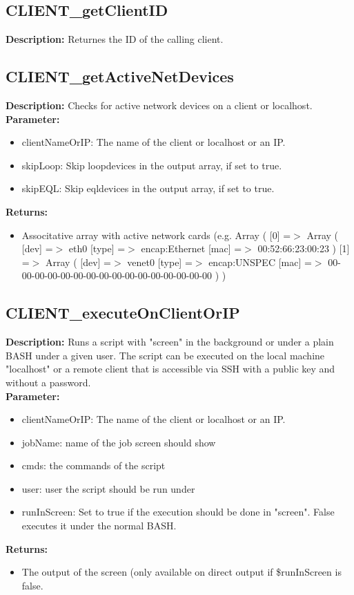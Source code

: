 \subsection{CLIENT\_getClientID}
\textbf{Description:} Returnes the ID of the calling client.\\

\subsection{CLIENT\_getActiveNetDevices}
\textbf{Description:} Checks for active network devices on a client or localhost.\\
\textbf{Parameter:}
\begin{itemize}
\item clientNameOrIP: The name of the client or localhost or an IP.
\item skipLoop: Skip loopdevices in the output array, if set to true.
\item skipEQL: Skip eqldevices in the output array, if set to true.
\end{itemize}
\textbf{Returns:}
\begin{itemize}
\item Associtative array with active network cards (e.g. Array ( [0] =$>$ Array ( [dev] =$>$ eth0 [type] =$>$ encap:Ethernet [mac] =$>$ 00:52:66:23:00:23 ) [1] =$>$ Array ( [dev] =$>$ venet0 [type] =$>$ encap:UNSPEC [mac] =$>$ 00-00-00-00-00-00-00-00-00-00-00-00-00-00-00-00 ) )
\end{itemize}

\subsection{CLIENT\_executeOnClientOrIP}
\textbf{Description:} Runs a script with "screen" in the background or under a plain BASH under a given user. The script can be executed on the local machine "localhost" or a remote client that is accessible via SSH with a public key and without a password.\\
\textbf{Parameter:}
\begin{itemize}
\item clientNameOrIP: The name of the client or localhost or an IP.
\item jobName: name of the job screen should show
\item cmds: the commands of the script 
\item user: user the script should be run under
\item runInScreen: Set to true if the execution should be done in "screen". False executes it under the normal BASH.
\end{itemize}
\textbf{Returns:}
\begin{itemize}
\item The output of the screen (only available on direct output if \$runInScreen is false.
\end{itemize}

